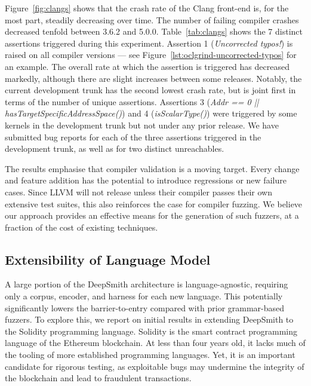 Figure~\ref{fig:clangs} shows that the crash rate of the Clang front-end is, for the most part, steadily decreasing over time. The number of failing compiler crashes decreased tenfold between 3.6.2 and 5.0.0. Table~\ref{tab:clangs} shows the 7 distinct assertions triggered during this experiment. Assertion 1 (\emph{Uncorrected typos!}) is raised on all compiler versions --- see Figure~\ref{lst:oclgrind-uncorrected-typos} for an example. The overall rate at which the assertion is triggered has decreased markedly, although there are slight increases between some releases. Notably, the current development trunk has the second lowest crash rate, but is joint first in terms of the number of unique assertions. Assertions 3 (\emph{Addr == 0 || hasTargetSpecificAddressSpace()}) and 4 (\emph{isScalarType()}) were triggered by some kernels in the development trunk but not under any prior release. We have submitted bug reports for each of the three assertions triggered in the development trunk, as well as for two distinct unreachables.

The results emphasise that compiler validation is a moving target. Every change and feature addition has the potential to introduce regressions or new failure cases. Since LLVM will not release unless their compiler passes their own extensive test suites, this also reinforces the case for compiler fuzzing. We believe our approach provides an effective means for the generation of such fuzzers, at a fraction of the cost of existing techniques.


\subsection{Extensibility of Language Model}
\label{subsec:deepsmith-solidity-extensibility}



A large portion of the DeepSmith architecture is language-agnostic, requiring only a corpus, encoder, and harness for each new language. This potentially significantly lowers the barrier-to-entry compared with prior grammar-based fuzzers. To explore this, we report on initial results in extending DeepSmith to the Solidity programming language. Solidity is the smart contract programming language of the Ethereum blockchain. At less than four years old, it lacks much of the tooling of more established programming languages. Yet, it is an important candidate for rigorous testing, as exploitable bugs may undermine the integrity of the blockchain and lead to fraudulent transactions.

